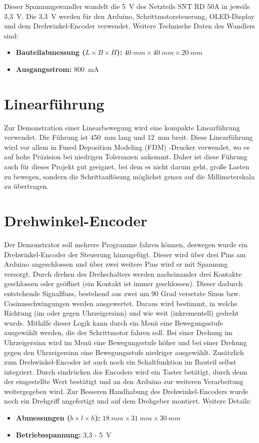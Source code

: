 Dieser Spannungswandler wandelt die 5\ V des Netzteils SNT RD 50A in jeweils 3,3\ V. Die 3,3\ V werden für den Arduino, Schrittmotorsteuerung, OLED-Display und dem Drehwinkel-Encoder verwendet. Weitere Technische Daten des Wandlers sind:
\begin{itemize}
	\item \textbf{Bauteilabmessung ($L\times B \times H$):} $40 \ mm \times 40 \ mm \times 20 \ mm$
	\item \textbf{Ausgangsstrom:} 800\ mA
\end{itemize}
	\cite{AMS.2024}
	
\section{Linearführung}

Zur Demonstration einer Linearbewegung wird eine kompakte Linearführung verwendet. Die Führung ist 450\ mm lang und 12\ mm breit. Diese Linearführung wird vor allem in Fused Deposition Modeling (FDM) -Drucker verwendet, wo es auf hohe Präzision bei niedrigen Toleranzen ankommt. Daher ist diese Führung auch für dieses Projekt gut geeignet, bei dem es nicht darum geht, große Lasten zu bewegen, sondern die Schrittauflösung möglichst genau auf die Millimeterskala zu übertragen.\cite{RoboterBausatz.2024}

\section{Drehwinkel-Encoder}

Der Demonstrator soll mehrere Programme fahren können, deswegen wurde ein Drehwinkel-Encoder der Steuerung hinzugefügt. Dieser wird über drei Pins am Arduino angeschlossen und über zwei weitere Pins wird er mit Spannung versorgt. Durch drehen des Drehschalters werden nacheinander drei Kontakte geschlossen oder geöffnet (ein Kontakt ist immer geschlossen). Dieser dadurch entstehende Signalfluss, bestehend aus zwei um 90 Grad versetzte Sinus bzw. Cosinusschwingungen werden ausgewertet. Daraus wird bestimmt, in welche Richtung (im oder gegen Uhrzeigersinn) und wie weit (inkrementell) gedreht wurde. Mithilfe dieser Logik kann durch ein Menü eine Bewegungsstufe ausgewählt werden, die der Schrittmotor fahren soll.\cite{Basler.2016} Bei einer Drehung im Uhrzeigersinn wird im Menü eine Bewegungsstufe höher und bei einer Drehung gegen den Uhrzeigersinn eine Bewegungsstufe niedriger ausgewählt. Zusätzlich zum Drehwinkel-Encoder ist auch noch ein Schaltfunktion im Bauteil selbst integriert. Durch eindrücken des Encoders wird ein Taster betätigt, durch denn der eingestellte Wert bestätigt und an den Arduino zur weiteren Verarbeitung weitergegeben wird. Zur Besseren Handhabung des Drehwinkel-Encoders wurde noch ein Drehgriff angefertigt und auf dem Drehgeber montiert.
Weitere Details: 
\begin{itemize}
	\item \textbf{Abmessungen ($b \times l \times h$):} $18 \ mm \times 31 \ mm \times 30 \ mm$
	\item \textbf{Betriebsspannung:} 3,3 - 5\ V
	\cite{SimacElec.2019}
\end{itemize}

